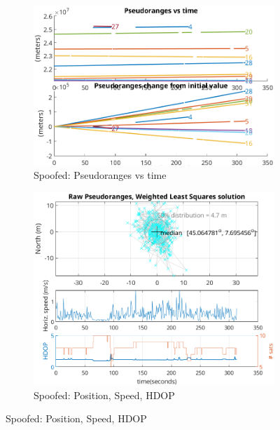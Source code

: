         \begin{figure}[h!]
            \centering
            \begin{subfigure}{0.23\textwidth}
                \includegraphics[width=\textwidth]{images/tests/Monte_Cappuccini/Spoofing/task5_figures/Samsung_A51_Monte_Cappuccini_fig1.png}
                \caption{Spoofed: Pseudoranges vs time}
            \end{subfigure}
            \hfill
            \begin{subfigure}{0.23\textwidth}
                \includegraphics[width=\textwidth]{images/tests/Monte_Cappuccini/Spoofing/task5_figures/Samsung_A51_Monte_Cappuccini_fig4.png}
                \caption{Spoofed: Position, Speed, HDOP}
            \end{subfigure}
        \end{figure}


